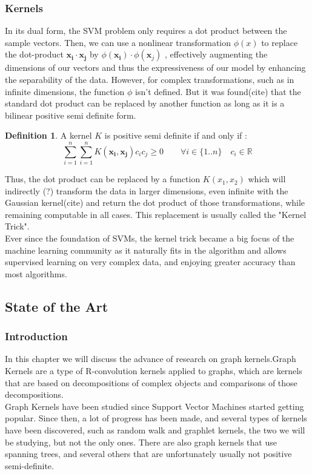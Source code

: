 \documentclass{article}
\let\vec\mathbf
\newcommand*{\R}{%
  \mathbb{R}%
}
\theoremstyle{definition}
\newtheorem{definition}{Definition}
\begin{document}
\subsubsection{Kernels}
In its dual form, the SVM problem only requires a dot product between the sample vectors. Then, we can use a nonlinear transformation $\phi(x)$ to replace the dot-product $\vec{x_i} \cdot \vec{x_j}$ by $\phi(\vec{x_{i}})\cdot\phi(\vec{x}_{j})$ , effectively augmenting the dimensions of our vectors and thus the expressiveness of our model by enhancing the separability of the data. However, for complex transformations, such as in infinite dimensions, the function $\phi$ isn't defined. But it was found(cite) that the standard dot product can be replaced by another function as long as it is a bilinear positive semi definite form. 
\begin{definition}
	A kernel $K$ is positive semi definite if and only if :\\
    \begin{equation}
    	\sum\limits_{i=1}^{n}\sum\limits_{i=1}^{n}K(\vec{x_{i}},\vec{x_{j}})c_{i}c_{j} \geq 0 \qquad \forall i \in \{1..n\} \quad c_i \in \R
    \end{equation}
\end{definition}
Thus, the dot product can be replaced by a function $K(x_1,x_2)$ which will indirectly (?) transform the data in larger dimensions, even infinite with the Gaussian kernel(cite) and return the dot product of those transformations, while remaining computable in all cases. This replacement is usually called the "Kernel Trick".\\
Ever since the foundation of SVMs, the kernel trick became a big focus of the machine learning community as it naturally fits in the algorithm and allows supervised learning on very complex data, and enjoying greater accuracy than most algorithms.
\subsection{State of the Art}
\subsubsection{Introduction}
In this chapter we will discuss the advance of research on graph kernels.Graph Kernels are a type of R-convolution kernels\cite{haussler99convolution} applied to graphs, which are kernels that are based on decompositions of complex objects and comparisons of those decompositions.\\
Graph Kernels have been studied since Support Vector Machines started getting popular\cite{kashima_graphkers_2003}. Since then, a lot of progress has been made, and several types of kernels have been discovered, such as random walk\cite{kashima_graphkers_2003} and graphlet\cite{shervashidze_efficient_2009} kernels, the two we will be studying, but not the only ones. There are also graph kernels that use spanning trees, and several others that are unfortunately usually not positive semi-definite\cite{shervashidze_scalable_2012}.
\end{document}
